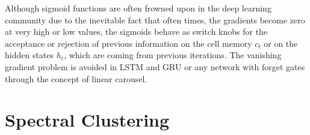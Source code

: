 \begin{appendices}
Although sigmoid functions are often frowned upon in the deep learning community due to the inevitable fact that often times, the gradients become zero at very high or low values, the sigmoids behave as switch knobs for the acceptance or rejection of previous information on the cell memory $c_t$ or on the hidden states $h_t$, which are coming from previous iterations. The vanishing gradient problem is avoided in LSTM and GRU or any network with forget gates through the concept of linear carousel.


\section{Spectral Clustering} \label{app:spectralclustering}

\end{appendices}
